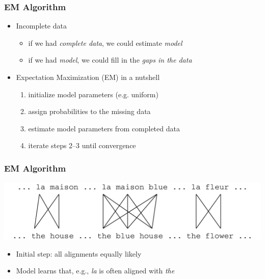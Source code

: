 \begin{frame}
\frametitle{EM Algorithm\koehnref}
\begin{block}{}
\begin{itemize}[<+->]
\item Incomplete data
\begin{itemize}
\item if we had {\em complete data}, we could estimate {\em model}
\item if we had {\em model}, we could fill in the {\em gaps in the data}
\end{itemize}
\item Expectation Maximization (EM) in a nutshell
\begin{enumerate}
\item initialize model parameters (e.g. uniform)
\item assign probabilities to the missing data
\item estimate model parameters from completed data
\item iterate steps 2--3 until convergence 
\end{enumerate}
\end{itemize}
\end{block}

\end{frame}

\begin{frame}
\frametitle{EM Algorithm\koehnref}
\begin{center}
\includegraphics[scale=0.4]{figures/em1.pdf}
\end{center}
\begin{itemize}
\item Initial step: all alignments equally likely
\item Model learns that, e.g., \textit{la} is often aligned with \textit{the}
\end{itemize}

\end{frame}

